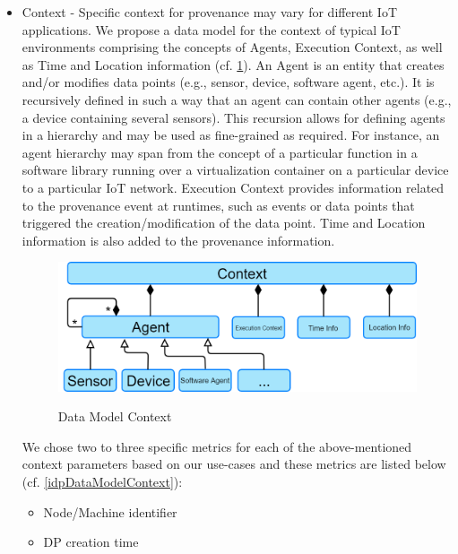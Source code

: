 \begin{itemize}
	\begin{itemize}			
			\item Example: 
\begin{lstlisting}			
[{
    "average": [   // Contribution type
        "5a81c07800031ddaf123",
        "5a81c093000a1d341fab"
    ]
}]		
\end{lstlisting}
	\end{itemize}
	\item Context - Specific context for provenance may vary for different IoT applications. We propose a data model for the context of typical IoT environments comprising the concepts of Agents, Execution Context, as well as Time and Location information (cf. \ref{dataModelContext}). An Agent is an entity that creates and/or modifies data points (e.g., sensor, device,  software agent, etc.). It is recursively defined in such a way that an agent can contain other agents (e.g., a device containing several sensors). This recursion allows for defining agents in a hierarchy and may be used as fine-grained as required. For instance, an agent hierarchy may span from the concept of a particular function in a software library running over a virtualization container on a particular device to a particular IoT network. Execution Context provides information related to the provenance event at runtimes, such as events or data points that triggered the creation/modification of the data point. Time and Location information is also added to the provenance information.
\begin{figure}[h]
\centering
\includegraphics[width=\linewidth]{figures/context.png}\\
\caption{Data Model Context}
\label{dataModelContext}
\end{figure}
We chose two to three specific metrics for each of the above-mentioned context parameters based on our use-cases and these metrics are listed below  (cf. \ref{idpDataModelContext}):
		\begin{itemize}
			\item Node/Machine  identifier
			\item DP creation time

\end{itemize}
\end{itemize}
